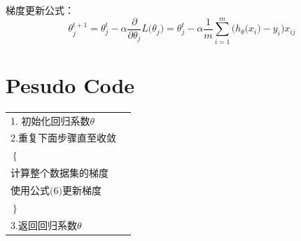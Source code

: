 \documentclass{ctexart}
\begin{document}
\begin{description}
梯度更新公式：
\begin{equation}
\theta_j^{t+1}=\theta_j^t-\alpha\frac{\partial}{\partial \theta_j}L\big(\theta_j\big)=\theta_j^t-\alpha\frac{1}{m}\sum_{i=1}^{m}\big(h_\theta\big(x_i\big)-y_i\big)x_{ij}
\end{equation}

\end{description} 

 

\section{Pesudo Code}

\begin{tabular}{ll}
1. 初始化回归系数$\theta$\\
2.重复下面步骤直至收敛\\
\quad$ \left\{ \right.$ \\
\quad \quad 计算整个数据集的梯度\\
\quad \quad 使用公式$\big(6\big)$更新梯度\\
\quad $\left. \right\}$ \\
3.返回回归系数$\theta$

\end{tabular}
%
\end{document}
